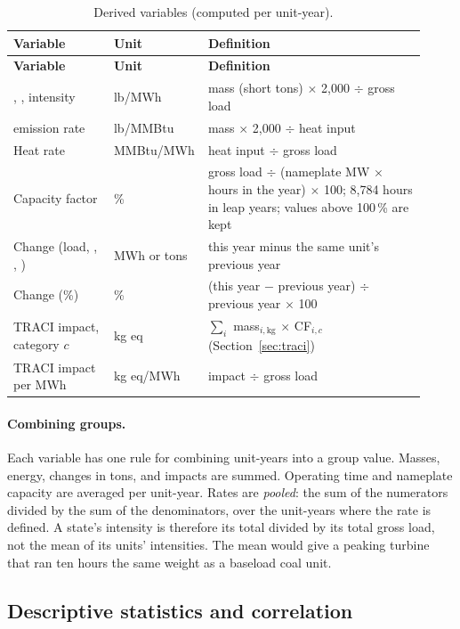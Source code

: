 \documentclass[11pt,a4paper]{article}
\begin{document}
{\small
\begin{longtable}{@{}R{0.24\linewidth}R{0.16\linewidth}R{0.52\linewidth}@{}}
\caption{Derived variables (computed per unit-year).}\label{tab:variables}\\
\toprule
\textbf{Variable} & \textbf{Unit} & \textbf{Definition}\\
\midrule\endfirsthead
\toprule
\textbf{Variable} & \textbf{Unit} & \textbf{Definition}\\
\midrule\endhead
\COtwo{}, \SOtwo{}, \NOx{} intensity & lb/MWh & mass (short tons) $\times$ 2{,}000 $\div$ gross load\\
\NOx{} emission rate & lb/MMBtu & \NOx{} mass $\times$ 2{,}000 $\div$ heat input\\
Heat rate & MMBtu/MWh & heat input $\div$ gross load\\
Capacity factor & \% & gross load $\div$ (nameplate MW $\times$ hours in the year) $\times$ 100; 8{,}784 hours in leap years; values above 100\,\% are kept\\
Change (load, \COtwo{}, \SOtwo{}, \NOx{}) & MWh or tons & this year minus the same unit's previous year\\
Change (\%) & \% & (this year $-$ previous year) $\div$ previous year $\times$ 100\\
TRACI impact, category $c$ & kg eq & $\sum_i$ mass$_{i,\text{kg}}$ $\times$ CF$_{i,c}$ (Section~\ref{sec:traci})\\
TRACI impact per MWh & kg eq/MWh & impact $\div$ gross load\\
\bottomrule
\end{longtable}}

\paragraph{Combining groups.} Each variable has one rule for combining unit-years into a group
value. Masses, energy, changes in tons, and impacts are summed. Operating time and nameplate
capacity are averaged per unit-year. Rates are \emph{pooled}: the sum of the numerators divided
by the sum of the denominators, over the unit-years where the rate is defined. A state's
\COtwo{} intensity is therefore its total \COtwo{} divided by its total gross load, not the mean
of its units' intensities. The mean would give a peaking turbine that ran ten hours the same
weight as a baseload coal unit.

\subsection{Descriptive statistics and correlation}
\end{document}
